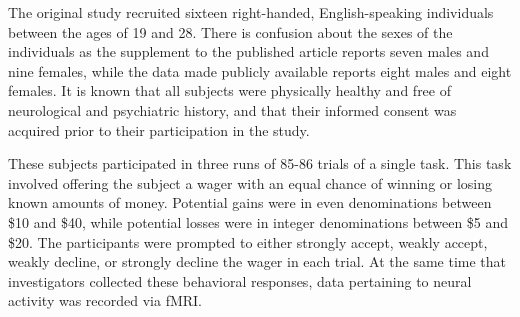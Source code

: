 \par The original study recruited sixteen right-handed, English-speaking
individuals between the ages of 19 and 28. There is confusion about the sexes of
the individuals as the supplement to the published article reports seven males
and nine females, while the data made publicly available reports eight males and
eight females. It is known that all subjects were physically healthy and free of
neurological and psychiatric history, and that their informed consent was
acquired prior to their participation in the study.
\par \indent These subjects participated in three runs of 85-86 trials of a
single task. This task involved offering the subject a wager with an equal
chance of winning or losing known amounts of money. Potential gains were in even
denominations between \$10 and \$40, while potential losses were in integer
denominations between \$5 and \$20. The participants were prompted to either
strongly accept, weakly accept, weakly decline, or strongly decline the wager in
each trial. At the same time that investigators collected these behavioral
responses, data pertaining to neural activity was recorded via fMRI.
\par \indent